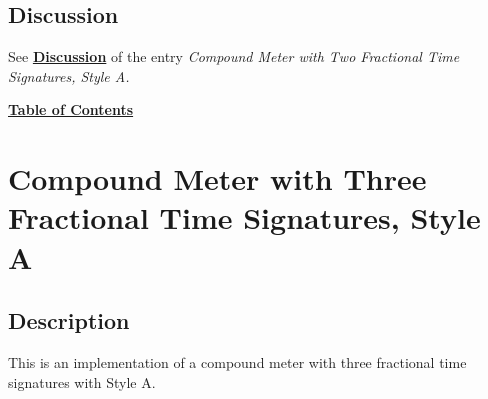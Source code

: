 \subsection{Discussion}
See \hyperref[sec:compoundfractionalmeter_discussion]{\textbf{Discussion}} of the entry \textit{Compound Meter with Two Fractional Time Signatures, Style A.} \par

\hyperref[sec:toc]{\textbf{Table of Contents}}

\vfill \break





\section {Compound Meter with Three Fractional Time Signatures, Style A}

\hfill
{}
\hfill

\subsection{Description}
This is an implementation of a compound meter with three fractional time signatures with Style A.  


